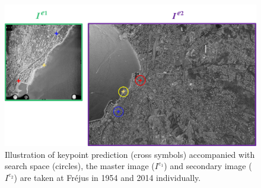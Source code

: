 \begin{figure}[htbp]
	\begin{center}
				\centering
				\includegraphics[width=1\columnwidth]{images/Chapitre4/guidedexample.png}
		\caption{Illustration of keypoint prediction (cross symbols) accompanied with search space (circles), the master image ($I^{e_1}$) and secondary image ($I^{e_2}$) are taken at Fr{\'e}jus in 1954 and 2014 individually.}
		\label{guidedexample}
	\end{center}
\end{figure}

